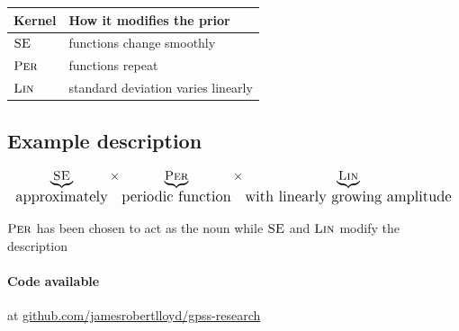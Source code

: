 \documentclass[landscape,a0b,final,a4resizeable]{a0poster}
\newenvironment{poster}{
  \begin{center}
  \begin{minipage}[c]{0.96\textwidth}
}{
  \end{minipage} 
  \end{center}
}
\begin{document}
\begin{poster}
\begin{multicols}{3}
\vspace{1\baselineskip}

\centering
\begin{tabular}{l|l}
Kernel & How it modifies the prior \\
\midrule
$\textsc{SE}$ & functions change smoothly \\
${\textsc{Per}}$ & functions repeat \\
${\textsc{Lin}}$ & standard deviation varies linearly
\end{tabular}

\vspace{1\baselineskip}

\raggedright
\subsection*{Example description}

{\large
\begin{align*}
  \underbrace{{\textsc{SE}}}_{\textnormal{\large approximately}} \times
  \underbrace{{\textsc{Per}}}_{\textnormal{\large periodic function}} \times 
  \underbrace{{\textsc{Lin}}}_{\textnormal{\large with linearly growing amplitude}}
\end{align*}
}

${\textsc{Per}}$ has been chosen to act as the noun while ${\textsc{SE}}$ and ${\textsc{Lin}}$ modify the description


\vspace{1\baselineskip}

\raggedright
\paragraph{Code available} at \url{github.com/jamesrobertlloyd/gpss-research}

\end{multicols}

\end{poster}
\end{document}
